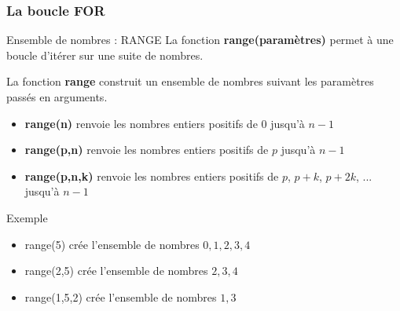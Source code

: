 \documentclass[8pt]{beamer}
\begin{document}
\begin{frame}
\frametitle{La boucle FOR}

\begin{block}{Ensemble de nombres : RANGE}
La fonction \textbf{range(paramètres)} permet à une boucle d'itérer sur une suite de nombres.

La fonction \textbf{range} construit un ensemble de nombres suivant les paramètres passés en arguments.
\begin{itemize}
\item \textbf{range(n)} renvoie les nombres entiers positifs de $0$ jusqu'à $n-1$
\item \textbf{range(p,n)} renvoie les nombres entiers positifs de $p$ jusqu'à $n-1$
\item \textbf{range(p,n,k)} renvoie les nombres entiers positifs de $p$, $p+k$, $p+2k$, ... jusqu'à $n-1$ 
\end{itemize}
\end{block}

\begin{exampleblock}{Exemple}
\begin{itemize}
\item range(5) crée l'ensemble de nombres $0, 1, 2, 3, 4$
\item range(2,5) crée l'ensemble de nombres $2, 3, 4$
\item range(1,5,2) crée l'ensemble de nombres $1, 3$
\end{itemize}
\end{exampleblock}

\end{frame}
\end{document}
